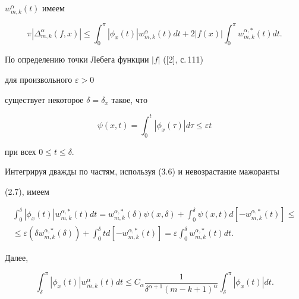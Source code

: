 $w^{\alpha}_{m,k}(t)$ имеем


\begin{equation}


\pi |\Delta_{m,k}^{\alpha}(f,x)|\le


\int_{0}^\pi |\phi_x (t)|w_{m,k}^{\alpha}(t)dt +


2|f(x)|\int_{0}^\pi w_{m,k}^{\alpha,*}(t)dt.


\end{equation}





По определению точки Лебега функции $|f|$ ([2], с.\,111) 


для произвольного $\varepsilon >0$


существует некоторое $\delta =\delta_x$ такое, что


\begin{equation}


\psi(x,t)=\int_0^t |\phi_x (\tau)|d\tau \le \varepsilon t 


\end{equation}


при всех $0\le t \le \delta$.


Интегрируя дважды по частям, используя (3.6) и невозрастание мажоранты


(2.7), имеем


\begin{multline}


\int_0^\delta |\phi_x (t)|w_{m,k}^{\alpha,*}(t)dt = 


w_{m,k}^{\alpha,*}(\delta)\psi (x,\delta)+\int_0^\delta


\psi (x,t)d[-w_{m,k}^{\alpha,*}(t)] \le \\


%


\le\varepsilon(\delta w_{m,k}^{\alpha,*}(\delta))+


\int_0^\delta td[-w_{m,k}^{\alpha,*}(t)]=


\varepsilon \int_0^\delta w_{m,k}^{\alpha,*}(t)dt.


\end{multline}


Далее,


\begin{equation}


\int_\delta^\pi |\phi_x (t)|w_{m,k}^{\alpha}(t)dt \le


C_{\alpha}\frac {1}{\delta^{\alpha+1}(m-k+1)^{\alpha}}


\int_\delta^\pi |\phi_x (t)|dt.


\end{equation}


